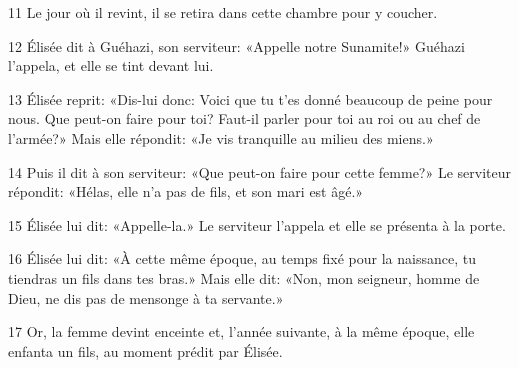 
11 Le jour où il revint, il se retira dans cette chambre pour y coucher.

12 Élisée dit à Guéhazi, son serviteur: «Appelle notre Sunamite!» Guéhazi l’appela, et elle se tint devant lui.

13 Élisée reprit: «Dis-lui donc: Voici que tu t’es donné beaucoup de peine pour nous. Que peut-on faire pour toi? Faut-il parler pour toi au roi ou au chef de l’armée?» Mais elle répondit: «Je vis tranquille au milieu des miens.»

14 Puis il dit à son serviteur: «Que peut-on faire pour cette femme?» Le serviteur répondit: «Hélas, elle n’a pas de fils, et son mari est âgé.»

15 Élisée lui dit: «Appelle-la.» Le serviteur l’appela et elle se présenta à la porte.

16 Élisée lui dit: «À cette même époque, au temps fixé pour la naissance, tu tiendras un fils dans tes bras.» Mais elle dit: «Non, mon seigneur, homme de Dieu, ne dis pas de mensonge à ta servante.»

17 Or, la femme devint enceinte et, l’année suivante, à la même époque, elle enfanta un fils, au moment prédit par Élisée.